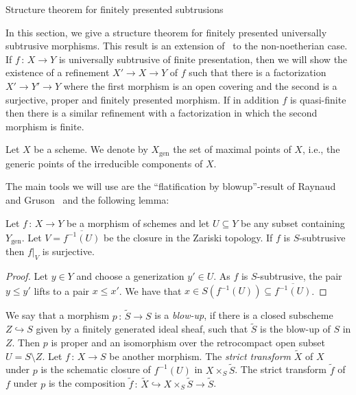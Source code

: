 \documentclass[a4paper,twoside,11pt]{amsart}[2009/07/02] %
\newcommand{\inj}{\hookrightarrow}
\newcommand{\map}[3]{#1\,:\, #2\rightarrow #3}
\newcommand{\genpts}{\mathrm{gen}} %
\begin{document}

\begin{section}{Structure theorem for finitely presented subtrusions}
\label{S:structure-theorems}

In this section, we give a structure theorem for finitely presented universally
subtrusive morphisms. This result is an extension
of~\cite[Thm.~3.1.9]{voevodsky_homology} to the non-noetherian case. If
$\map{f}{X}{Y}$ is universally subtrusive of finite presentation, then we will
show the existence of a refinement $X'\to X\to Y$ of $f$ such that there is a
factorization $X'\to Y'\to Y$ where the first morphism is an open covering and
the second is a surjective, proper and finitely presented morphism. If in
addition $f$ is quasi-finite then there is a similar refinement with a
factorization in which the second morphism is finite.

\begin{notation}
Let $X$ be a scheme. We denote by $X_\genpts$
the set of maximal points of $X$, i.e., the generic points of the irreducible
components of $X$.
\end{notation}

The main tools we will use are the ``flatification by blowup''-result of
Raynaud and Gruson~\cite{raynaud-gruson} and the following lemma:

\begin{lemma}\label{L:surjectivity-of-subtrusions}
Let $\map{f}{X}{Y}$ be a morphism of schemes and let $U\subseteq Y$ be
%
any subset containing $Y_\genpts$. Let $V=\overline{f^{-1}(U)}$ be the closure
in the Zariski topology. If $f$ is $S$-subtrusive then $f|_V$ is surjective.
\end{lemma}
\begin{proof}
Let $y\in Y$ and choose a generization $y'\in U$. As $f$ is $S$-subtrusive, the
pair $y\leq y'$ lifts to a pair $x\leq x'$. We have that
$x\in S(f^{-1}(U))\subseteq \overline{f^{-1}(U)}$.
\end{proof}

\begin{definition}
We say that a morphism $\map{p}{\widetilde{S}}{S}$ is a \emph{blow-up}, if
there is a closed subscheme $Z\inj S$ given by a finitely generated ideal
sheaf, such that $\widetilde{S}$ is the blow-up of $S$ in $Z$. Then $p$ is
proper and an isomorphism over the retrocompact open subset $U=S\setminus
Z$. Let $\map{f}{X}{S}$ be another morphism. The \emph{strict transform}
$\widetilde{X}$ of $X$ under $p$ is the schematic closure of $f^{-1}(U)$ in
$X\times_S \widetilde{S}$. The strict transform $\widetilde{f}$ of $f$ under
$p$ is the composition $\map{\widetilde{f}}{\widetilde{X}\inj X\times_S
\widetilde{S}}{\widetilde{S}}$.
\end{definition}


\end{section}
\end{document}
